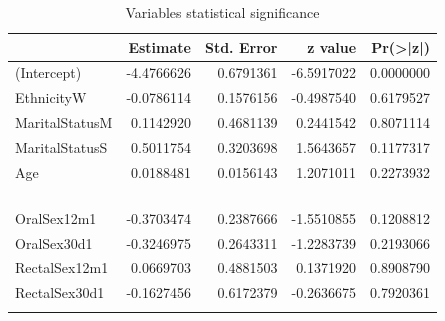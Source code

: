 \documentclass[
]{article}
\begin{document}
\begin{table}

\caption{\label{tab:variable-select}Variables statistical significance}
\centering
\begin{tabular}[t]{l|r|r|r|r}
\hline
  & Estimate & Std. Error & z value & Pr(>|z|)\\
\hline
(Intercept) & -4.4766626 & 0.6791361 & -6.5917022 & 0.0000000\\
\hline
EthnicityW & -0.0786114 & 0.1576156 & -0.4987540 & 0.6179527\\
\hline
MaritalStatusM & 0.1142920 & 0.4681139 & 0.2441542 & 0.8071114\\
\hline
MaritalStatusS & 0.5011754 & 0.3203698 & 1.5643657 & 0.1177317\\
\hline
Age & 0.0188481 & 0.0156143 & 1.2071011 & 0.2273932\\
\hline
\cellcolor{cyan}{\textcolor{white}{YearsSchool}} & \cellcolor{cyan}{\textcolor{white}{-0.1689015}} & \cellcolor{cyan}{\textcolor{white}{0.0442657}} & \cellcolor{cyan}{\textcolor{white}{-3.8156308}} & \cellcolor{cyan}{\textcolor{white}{0.0001358}}\\
\hline
\cellcolor{cyan}{\textcolor{white}{InitInfect2}} & \cellcolor{cyan}{\textcolor{white}{-0.3302518}} & \cellcolor{cyan}{\textcolor{white}{0.1740868}} & \cellcolor{cyan}{\textcolor{white}{-1.8970524}} & \cellcolor{cyan}{\textcolor{white}{0.0578210}}\\
\hline
\cellcolor{cyan}{\textcolor{white}{InitInfect3}} & \cellcolor{cyan}{\textcolor{white}{-0.3318821}} & \cellcolor{cyan}{\textcolor{white}{0.1755787}} & \cellcolor{cyan}{\textcolor{white}{-1.8902183}} & \cellcolor{cyan}{\textcolor{white}{0.0587288}}\\
\hline
\cellcolor{cyan}{\textcolor{white}{NumPartners}} & \cellcolor{cyan}{\textcolor{white}{0.1164568}} & \cellcolor{cyan}{\textcolor{white}{0.0598373}} & \cellcolor{cyan}{\textcolor{white}{1.9462257}} & \cellcolor{cyan}{\textcolor{white}{0.0516276}}\\
\hline
OralSex12m1 & -0.3703474 & 0.2387666 & -1.5510855 & 0.1208812\\
\hline
OralSex30d1 & -0.3246975 & 0.2643311 & -1.2283739 & 0.2193066\\
\hline
RectalSex12m1 & 0.0669703 & 0.4881503 & 0.1371920 & 0.8908790\\
\hline
RectalSex30d1 & -0.1627456 & 0.6172379 & -0.2636675 & 0.7920361\\
\hline
\cellcolor{cyan}{\textcolor{white}{AbPain1}} & \cellcolor{cyan}{\textcolor{white}{0.2969178}} & \cellcolor{cyan}{\textcolor{white}{0.1771403}} & \cellcolor{cyan}{\textcolor{white}{1.6761734}} & \cellcolor{cyan}{\textcolor{white}{0.0937042}}\\

\end{tabular}
\end{table}
\end{document}
